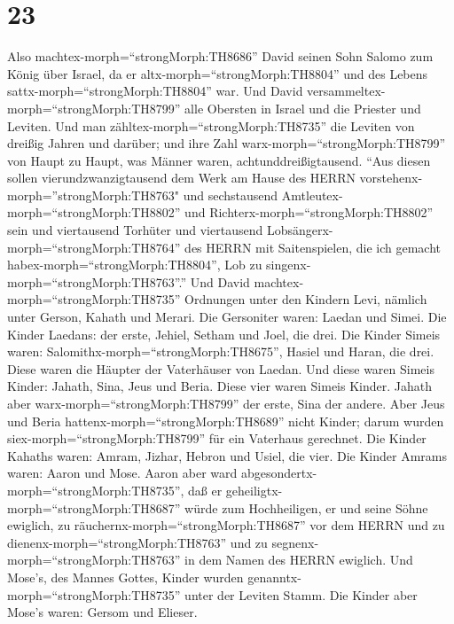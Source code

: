 \hypertarget{section-22}{%
\section{23}\label{section-22}}

 Also machtex-morph=``strongMorph:TH8686'' David seinen Sohn
Salomo zum König über Israel, da er altx-morph=``strongMorph:TH8804''
und des Lebens sattx-morph=``strongMorph:TH8804'' war.  Und
David versammeltex-morph=``strongMorph:TH8799'' alle Obersten in Israel
und die Priester und Leviten.  Und man
zähltex-morph=``strongMorph:TH8735'' die Leviten von dreißig Jahren und
darüber; und ihre Zahl warx-morph=``strongMorph:TH8799'' von Haupt zu
Haupt, was Männer waren, achtunddreißigtausend.  ``Aus
diesen sollen vierundzwanzigtausend dem Werk am Hause des HERRN
vorstehenx-morph=''strongMorph:TH8763" und sechstausend
Amtleutex-morph=``strongMorph:TH8802'' und
Richterx-morph=``strongMorph:TH8802'' sein  und viertausend
Torhüter und viertausend Lobsängerx-morph=``strongMorph:TH8764'' des
HERRN mit Saitenspielen, die ich gemacht
habex-morph=``strongMorph:TH8804'', Lob zu
singenx-morph=``strongMorph:TH8763''.''  Und David
machtex-morph=``strongMorph:TH8735'' Ordnungen unter den Kindern Levi,
nämlich unter Gerson, Kahath und Merari.  Die Gersoniter
waren: Laedan und Simei.  Die Kinder Laedans: der erste,
Jehiel, Setham und Joel, die drei.  Die Kinder Simeis waren:
Salomithx-morph=``strongMorph:TH8675'', Hasiel und Haran, die drei.
Diese waren die Häupter der Vaterhäuser von Laedan.  Und
diese waren Simeis Kinder: Jahath, Sina, Jeus und Beria. Diese vier
waren Simeis Kinder.  Jahath aber
warx-morph=``strongMorph:TH8799'' der erste, Sina der andere. Aber Jeus
und Beria hattenx-morph=``strongMorph:TH8689'' nicht Kinder; darum
wurden siex-morph=``strongMorph:TH8799'' für ein Vaterhaus gerechnet.
 Die Kinder Kahaths waren: Amram, Jizhar, Hebron und Usiel,
die vier.  Die Kinder Amrams waren: Aaron und Mose. Aaron
aber ward abgesondertx-morph=``strongMorph:TH8735'', daß er
geheiligtx-morph=``strongMorph:TH8687'' würde zum Hochheiligen, er und
seine Söhne ewiglich, zu räuchernx-morph=``strongMorph:TH8687'' vor dem
HERRN und zu dienenx-morph=``strongMorph:TH8763'' und zu
segnenx-morph=``strongMorph:TH8763'' in dem Namen des HERRN ewiglich.
 Und Mose's, des Mannes Gottes, Kinder wurden
genanntx-morph=``strongMorph:TH8735'' unter der Leviten Stamm.
 Die Kinder aber Mose's waren: Gersom und Elieser.
